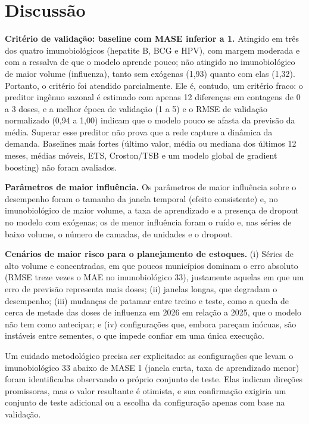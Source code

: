 \documentclass[
    12pt,
    openright,
    oneside,
    a4paper,
    english,
    brazil
]{abntex2}
\begin{document}
\section{Discussão}
\label{sec:discussao}

\textbf{Critério de validação: baseline com MASE inferior a 1.} Atingido em três dos quatro imunobiológicos (hepatite B, BCG e HPV), com margem moderada e com a ressalva de que o modelo aprende pouco; não atingido no imunobiológico de maior volume (influenza), tanto sem exógenas (1,93) quanto com elas (1,32). Portanto, o critério foi atendido parcialmente. Ele é, contudo, um critério fraco: o preditor ingênuo sazonal é estimado com apenas 12 diferenças em contagens de 0 a 3 doses, e a melhor época de validação (1 a 5) e o RMSE de validação normalizado (0,94 a 1,00) indicam que o modelo pouco se afasta da previsão da média. Superar esse preditor não prova que a rede capture a dinâmica da demanda. Baselines mais fortes (último valor, média ou mediana dos últimos 12 meses, médias móveis, ETS, Croston/TSB e um modelo global de gradient boosting) não foram avaliados.

\textbf{Parâmetros de maior influência.} Os parâmetros de maior influência sobre o desempenho foram o tamanho da janela temporal (efeito consistente) e, no imunobiológico de maior volume, a taxa de aprendizado e a presença de dropout no modelo com exógenas; os de menor influência foram o ruído e, nas séries de baixo volume, o número de camadas, de unidades e o dropout.

\textbf{Cenários de maior risco para o planejamento de estoques.} (i) Séries de alto volume e concentradas, em que poucos municípios dominam o erro absoluto (RMSE treze vezes o MAE no imunobiológico 33), justamente aquelas em que um erro de previsão representa mais doses; (ii) janelas longas, que degradam o desempenho; (iii) mudanças de patamar entre treino e teste, como a queda de cerca de metade das doses de influenza em 2026 em relação a 2025, que o modelo não tem como antecipar; e (iv) configurações que, embora pareçam inócuas, são instáveis entre sementes, o que impede confiar em uma única execução.

Um cuidado metodológico precisa ser explicitado: as configurações que levam o imunobiológico 33 abaixo de MASE 1 (janela curta, taxa de aprendizado menor) foram identificadas observando o próprio conjunto de teste. Elas indicam direções promissoras, mas o valor resultante é otimista, e sua confirmação exigiria um conjunto de teste adicional ou a escolha da configuração apenas com base na validação.
\end{document}
